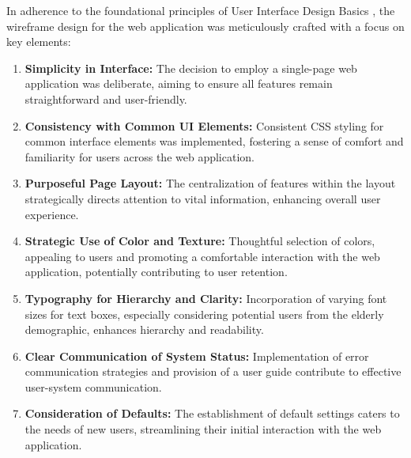 \documentclass{l4proj}
\begin{document}
In adherence to the foundational principles of User Interface Design Basics \citep{Usability.gov_2014}, the wireframe design for the web application was meticulously crafted with a focus on key elements:
\begin{enumerate}[{UI}.1]
    \item \textbf{Simplicity in Interface:} The decision to employ a single-page web application was deliberate, aiming to ensure all features remain straightforward and user-friendly.
    \item \textbf{Consistency with Common UI Elements:} Consistent CSS styling for common interface elements was implemented, fostering a sense of comfort and familiarity for users across the web application.
    \item \textbf{Purposeful Page Layout:} The centralization of features within the layout strategically directs attention to vital information, enhancing overall user experience.
    \item \textbf{Strategic Use of Color and Texture:} Thoughtful selection of colors, appealing to users and promoting a comfortable interaction with the web application, potentially contributing to user retention.
    \item \textbf{Typography for Hierarchy and Clarity:} Incorporation of varying font sizes for text boxes, especially considering potential users from the elderly demographic, enhances hierarchy and readability.
    \item \textbf{Clear Communication of System Status:} Implementation of error communication strategies and provision of a user guide contribute to effective user-system communication.
    \item \textbf{Consideration of Defaults:} The establishment of default settings caters to the needs of new users, streamlining their initial interaction with the web application.
\end{enumerate}
\end{document}
